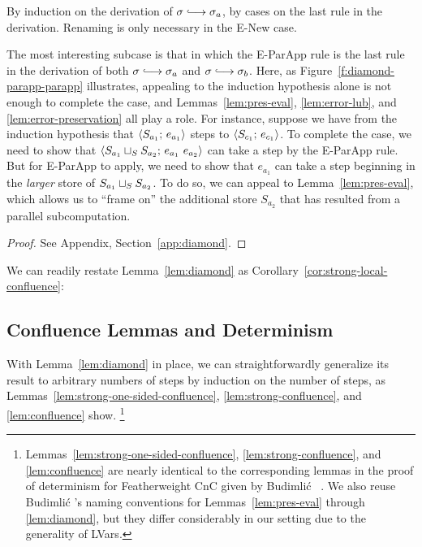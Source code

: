 \LemDiamond
\ifx\fulltr\undefined
\begin{proofsketch}
  By induction on the derivation of $\conf \parstepsto \conf_a$, by
  cases on the last rule in the derivation.
  Renaming is only necessary in the {\sc E-New} case.

  The most interesting
  subcase is that in which the {\sc E-ParApp} rule is the last rule in
  the derivation of both $\conf \parstepsto \conf_a$ and $\conf
  \parstepsto \conf_b$.
  Here, as Figure~\ref{f:diamond-parapp-parapp}
  illustrates, appealing to the induction hypothesis alone is not enough to
  complete the case, and Lemmas~\ref{lem:pres-eval}, 
  \ref{lem:error-lub}, and \ref{lem:error-preservation} all play a role.  
  For instance, suppose we have from the induction hypothesis that
  $\langle S_{a_1};\, e_{a_1} \rangle$ steps to $\langle S_{c_1};\, e_{c_1} \rangle$.
  To complete the case, we need to show that
  $\langle S_{a_1} \sqcup_{S} S_{a_2};\, e_{a_1}~e_{a_2} \rangle$ can
  take a step by the {\sc E-ParApp} rule.
  But for {\sc E-ParApp} to apply,
  we need to show that $e_{a_1}$ can take a step beginning in the
  \emph{larger} store of $S_{a_1} \sqcup_{S} S_{a_2}$.  To do so, we
  can appeal to Lemma~\ref{lem:pres-eval}, which allows us to ``frame
  on'' the additional store $S_{a_2}$ that has resulted from a
  parallel subcomputation.
\end{proofsketch}
\else
\begin{proof}
See Appendix, Section~\ref{app:diamond}.
\end{proof}
\fi

\noindent We can readily restate Lemma~\ref{lem:diamond} as
Corollary~\ref{cor:strong-local-confluence}:

\LemStrongLocalConfluence

\subsection{Confluence Lemmas and Determinism}

With Lemma~\ref{lem:diamond} in place, we can straightforwardly
generalize its result to arbitrary numbers of steps by induction on the number of
steps, as Lemmas~\ref{lem:strong-one-sided-confluence},
\ref{lem:strong-confluence}, and \ref{lem:confluence} show.  
\footnote{Lemmas~\ref{lem:strong-one-sided-confluence},
\ref{lem:strong-confluence}, and \ref{lem:confluence}
  are nearly identical to the corresponding lemmas in
  the proof of determinism for Featherweight CnC given by
  Budimli\'c \etal~\cite{CnC}. We also reuse Budimli\'c \etal's naming
  conventions for Lemmas~\ref{lem:pres-eval} through
  \ref{lem:diamond}, but they
  differ considerably in our setting due to the generality of LVars.}

